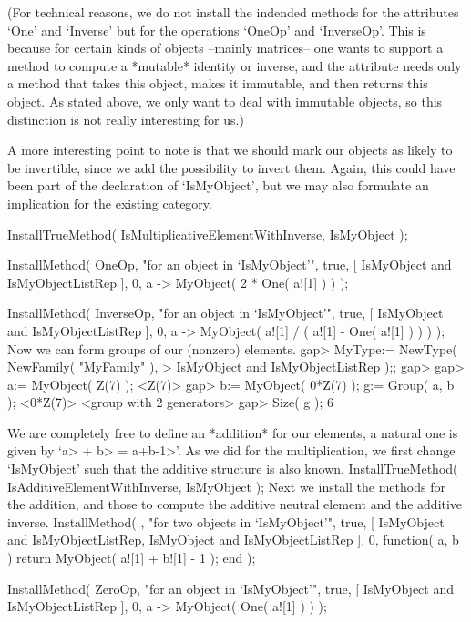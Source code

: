 (For technical reasons, we do not install the indended methods for
the attributes `One' and `Inverse' but for the operations `OneOp'
and `InverseOp'.
This is because for certain kinds of objects --mainly matrices--
one wants to support a method to compute a *mutable* identity or
inverse, and the attribute needs only a method that takes this
object, makes it immutable, and then returns this object.
As stated above, we only want to deal with immutable objects,
so this distinction is not really interesting for us.)

A more interesting point to note is that we should mark our objects
as likely to be invertible,
since we add the possibility to invert them.
Again, this could have been part of the declaration of `IsMyObject',
but we may also formulate an implication for the existing category.

\begintt
InstallTrueMethod( IsMultiplicativeElementWithInverse, IsMyObject );

InstallMethod( OneOp,
    "for an object in `IsMyObject'",
    true,
    [ IsMyObject and IsMyObjectListRep ], 0,
    a -> MyObject( 2 * One( a![1] ) ) );

InstallMethod( InverseOp,
    "for an object in `IsMyObject'",
    true,
    [ IsMyObject and IsMyObjectListRep ], 0,
    a -> MyObject( a![1] / ( a![1] - One( a![1] ) ) ) );
\endtt
Now we can form groups of our (nonzero) elements.
\begintt
gap> MyType:= NewType( NewFamily( "MyFamily" ),
>                   IsMyObject and IsMyObjectListRep );;
gap> 
gap> a:= MyObject( Z(7) );
<Z(7)>
gap> b:= MyObject( 0*Z(7) );  g:= Group( a, b );
<0*Z(7)>
<group with 2 generators>
gap> Size( g );
6
\endtt

We are completely free to define an *addition* for our elements,
a natural one is given by `\<a> + \<b> = \<a+b-1>'.
As we did for the multiplication, we first change `IsMyObject'
such that the additive structure is also known.
\begintt
InstallTrueMethod( IsAdditiveElementWithInverse, IsMyObject );
\endtt
Next we install the methods for the addition,
and those to compute the additive neutral element
and the additive inverse.
\begintt
InstallMethod( \+,
    "for two objects in `IsMyObject'",
    true,
    [ IsMyObject and IsMyObjectListRep,
      IsMyObject and IsMyObjectListRep ], 0,
    function( a, b )
    return MyObject( a![1] + b![1] - 1 );
    end );

InstallMethod( ZeroOp,
    "for an object in `IsMyObject'",
    true,
    [ IsMyObject and IsMyObjectListRep ], 0,
    a -> MyObject( One( a![1] ) ) );

